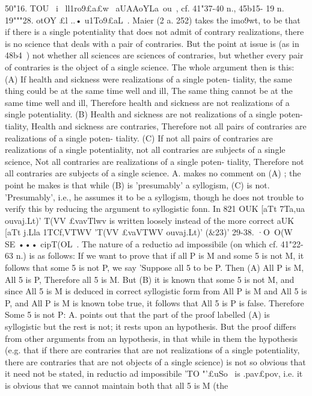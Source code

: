 {{{{{{{{{{{{{{{{{{{{{{{{{{{{{{{{{{{{{50"16. TOU~ i~ ll1ro9£a£w~ aUAAoYLa~ou~, cf. 41"37-40 n., 45b15-
19 n.
19"""28. otOY £l ..• u1To9£aL~. Maier (2 a. 252) takes the imo9wt,
to be that if there is a single potentiality that does not admit
of contrary realizations, there is no science that deals with a pair
of contraries. But the point at issue is (as in 48b4~) not whether
all sciences are sciences of contraries, but whether every pair of
contraries is the object of a single science. The whole argument
then is this:
(A) If health and sickness were realizations of a single poten-
tiality, the same thing could be at the same time well
and ill, The same thing cannot be at the same time well
and ill, Therefore health and sickness are not realizations
of a single potentiality.
(B) Health and sickness are not realizations of a single poten-
tiality, Health and sickness are contraries, Therefore not
all pairs of contraries are realizations of a single poten-
tiality.
(C) If not all pairs of contraries are realizations of a single
potentiality, not all contraries are subjects of a single
science, Not all contraries are realizations of a single poten-
tiality, Therefore not all contraries are subjects of a single
science.
A. makes no comment on (A) ; the point he makes is that while
(B) is 'presumably' a syllogism, (C) is not. 'Presumably', i.e.,
he assumes it to be a syllogism, though he does not trouble to
verify this by reducing the argument to syllogistic fonn.
In 821 OUK [aTt 7Ta,ua ouvaj.Lt)' T(VV £vavTlwv is written loosely
instead of the more correct aUK [aTt j.Lla 1TCf,VTWV 'T(VV £vaVT{WV
ouvaj.Lt)' (&23)'
29-38. ·O~O(W~
SE ••• cipT(OL~. The nature of a reductio ad
impossibile (on which cf. 41"22-63 n.) is as follows: If we want to
prove that if all P is M and some 5 is not M, it follows that some
5 is not P, we say 'Suppose all 5 to be P. Then (A) All P is M,
All 5 is P, Therefore all 5 is M. But (B) it is known that some
5 is not M, and since All 5 is M is deduced in correct syllogistic
form from All P is M and All 5 is P, and All P is M is known tobe true, it follows that All 5 is P is false. Therefore Some 5 is
not P:
A. points out that the part of the proof labelled (A) is syllogistic
but the rest is not; it rests upon an hypothesis. But the proof
differs from other arguments from an hypothesis, in that while
in them the hypothesis (e.g. that if there are contraries that are
not realizations of a single potentiality, there are contraries that
are not objects of a single science) is not so obvious that it need
not be stated, in reductio ad impossibile 'TO "'£uSo~ is .pav£pov, i.e.
it is obvious that we cannot maintain both that all 5 is M (the
}}}}}}}}}}}}}}}}}}}}}}}}}}}}}}}}}}}}}}
